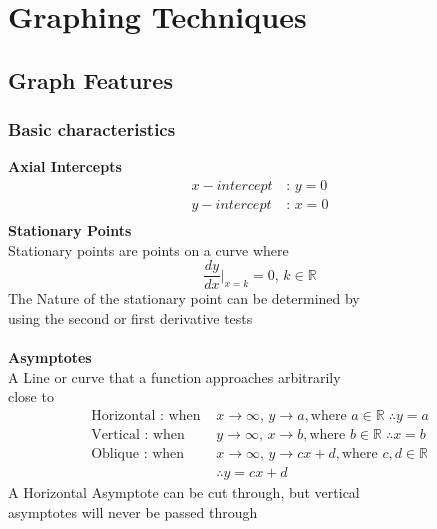 \documentclass[../main.tex]{subfiles}
\begin{document}
\section{Graphing Techniques}

\subsection{Graph Features}

\subsubsection{Basic characteristics}
\textbf{Axial Intercepts}
\begin{align*}
    x-intercept \, &: \, y=0 \\
    y-intercept \, &: \, x=0 \\
\end{align*}
\textbf{Stationary Points} \\
Stationary points are points on a curve where \\
\[\frac{dy}{dx}\bigg|_{x=k}=0, \, k \in \mathbb{R}\]
The Nature of the stationary point can be determined by \\
using the second or first derivative tests \\\\
\textbf{Asymptotes} \\
A Line or curve that a function approaches arbitrarily \\
close to
\begin{align*}
    \text{Horizontal : when } &x \to \infty, \, y \to a, \text{where } a \in \mathbb{R} \; \therefore y=a \\
    \text{Vertical : when } &y \to \infty, \, x \to b, \text{where } b \in \mathbb{R} \; \therefore x=b  \\
    \text{Oblique : when } &x \to \infty, \, y \to cx+d, \text{where } c,d \in \mathbb{R} \\
                           &\therefore y=cx+d
\end{align*}
A Horizontal Asymptote can be cut through, but vertical \\
asymptotes will never be passed through
\end{document}
